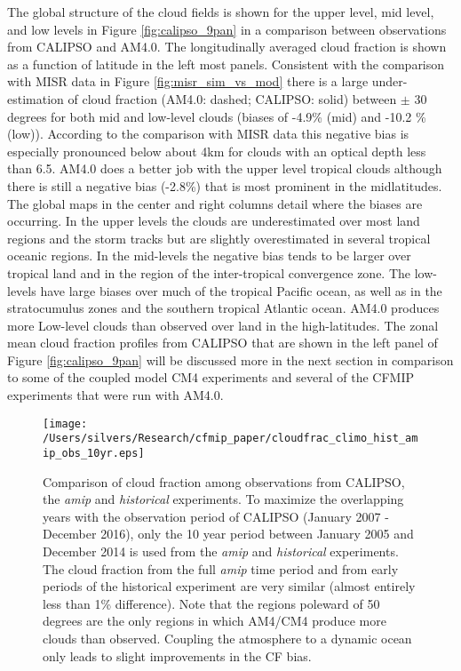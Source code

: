 \documentclass[draft]{agujournal2019}
\begin{document}
The global structure of the cloud fields is shown for the upper level, mid level, and low levels in 
Figure \ref{fig:calipso_9pan} in a comparison between observations from CALIPSO and AM4.0.
The longitudinally averaged cloud fraction is shown as a function of latitude in the left most panels.  
Consistent with the comparison with MISR data in Figure \ref{fig:misr_sim_vs_mod} there is a large under-estimation 
of cloud fraction (AM4.0: dashed; CALIPSO: solid) between 
$\pm$ 30 degrees for both mid and low-level clouds (biases of -4.9\% (mid) and -10.2 \% (low)). 
According to the comparison with MISR data this negative bias is especially pronounced below about 4km
for clouds with an optical depth less than 6.5.    
AM4.0 does a better job with the upper level tropical clouds although there is still a negative bias (-2.8\%) 
that is most prominent in the midlatitudes.   
The global maps  in the center and right columns detail where the biases are occurring.  
In the upper levels the clouds are underestimated over most land regions and the storm tracks but are 
slightly overestimated in several tropical oceanic regions.  In the mid-levels the negative bias tends to be larger 
over tropical land and in the region of the inter-tropical convergence zone.  
The low-levels have large biases over much of the tropical Pacific ocean, as well as in the stratocumulus zones 
and the southern tropical Atlantic ocean.   
AM4.0 produces more Low-level clouds than observed over land in the high-latitudes.  
The zonal mean cloud fraction profiles from CALIPSO that are shown in the left panel of  Figure \ref{fig:calipso_9pan}
will be discussed more in the next section in comparison to some of the coupled model CM4 experiments and
several of the CFMIP experiments that were run with AM4.0.  

\begin{figure}
  \centering
  \texttt{[image: /Users/silvers/Research/cfmip\_paper/cloudfrac\_climo\_hist\_amip\_obs\_10yr.eps]}
  \caption{Comparison of cloud fraction among observations from CALIPSO, the \textit{amip} and 
  \textit{historical} experiments.  To maximize the overlapping years with the observation period of CALIPSO
  (January 2007 - December 2016), only the 10 year period between January 2005 and December 2014 is
  used from the \textit{amip} and  \textit{historical} experiments.  The cloud fraction from the full \textit{amip}
  time period and from early periods of the historical experiment are very similar 
  (almost entirely less than 1\% difference).   Note that the regions poleward of
  50 degrees are the only regions in which AM4/CM4 produce more clouds than observed.  
  Coupling the atmosphere to a dynamic ocean only leads to slight improvements in the CF bias.}
  \label{fig:calipso_amip_historical}
\end{figure}
\end{document}
